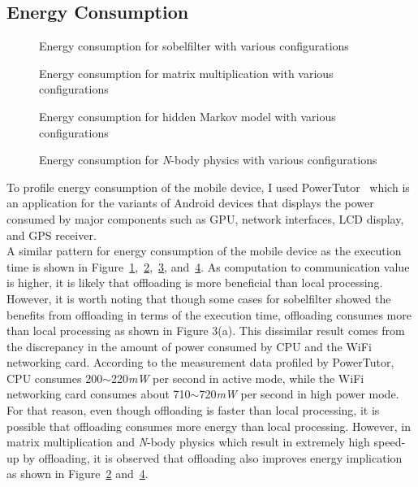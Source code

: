 \subsection{Energy Consumption}
\label{character:energy}
%
\begin{figure}
\centering
{}
\caption{Energy consumption for sobelfilter with various configurations}
\label{fig:energy_sobelfilter}
\end{figure}
%
\begin{figure}
\centering
{}
\caption{Energy consumption for matrix multiplication with various
configurations}
\label{fig:energy_matrix}
\end{figure}
%
\begin{figure}
\centering
{}
\caption{Energy consumption for hidden Markov model with various
configurations}
\label{fig:energy_hmm}
\end{figure}
%
\begin{figure}
\centering
{}
\caption{Energy consumption for {\it N}-body physics with various configurations}
\label{fig:energy_nbody}
\end{figure}
%
To profile energy consumption of the mobile device, I used
PowerTutor~\cite{powertutor} which is an application for the variants of Android
devices that displays the power consumed by major components such as
GPU, network interfaces, LCD display, and GPS receiver.\\ 
%
A similar pattern for energy consumption of the mobile device as
the execution time is shown in
Figure~\ref{fig:energy_sobelfilter},~\ref{fig:energy_matrix},~\ref{fig:energy_hmm},
and~\ref{fig:energy_nbody}.
%
As computation to communication value is higher, 
it is likely that offloading is more beneficial than local processing.
%
However, it is worth noting that though some cases for sobelfilter
showed the benefits from offloading in terms of the execution time,
offloading consumes more than local processing as shown in Figure
3(a).
%
This dissimilar result comes from the discrepancy in the amount of power
consumed by CPU and the WiFi networking card.
%
According to the measurement data profiled by PowerTutor, CPU consumes
200$\sim$220{\it mW} per second in active mode, while the
WiFi networking card consumes about 710$\sim$720{\it mW}
per second in high power mode.
%
For that reason, even though offloading is faster than local processing,
it is possible that offloading consumes more energy than local
processing.
%
However, in matrix multiplication and {\it N}-body physics which
result in extremely high speed-up by offloading, it is observed that
offloading also improves energy implication as shown in
Figure~\ref{fig:energy_matrix} and~\ref{fig:energy_nbody}. 
%
